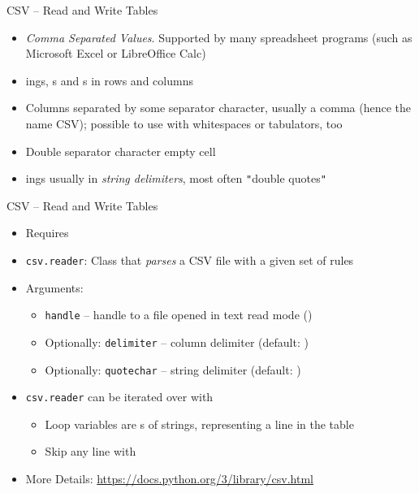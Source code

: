 
\begin{frame}[fragile]{CSV -- Read and Write Tables}
%
\begin{itemize}
\item \emph{Comma Separated Values}. Supported by many spreadsheet programs (such as Microsoft Excel or LibreOffice Calc)
\item {}ings, s and s in rows and columns
\item Columns separated by some separator character, usually a comma (hence the name CSV); possible to use with whitespaces or tabulators, too
\item Double separator character \Thus empty cell
\item {}ings usually in \emph{string delimiters}, most often  \texttt{"}double quotes\texttt{"}
\end{itemize}
%
\end{frame}


\begin{frame}[fragile]{CSV -- Read and Write Tables}
%
\begin{itemize}
\item Requires 
\item \texttt{csv.reader}: Class that \emph{parses} a CSV file with a given set of rules
\item Arguments:
	\begin{itemize}
	\item \texttt{handle} -- handle to a file opened in text read mode ()
	\item Optionally: \texttt{delimiter} -- column delimiter (default: )
	\item Optionally: \texttt{quotechar} -- string delimiter (default: )
	\end{itemize}
\item \texttt{csv.reader} can be iterated over with 
	\begin{itemize}
	\item Loop variables are s of strings, representing a line in the table
	\item Skip any line with 
	\end{itemize}
\item More Details: \url{https://docs.python.org/3/library/csv.html}
\end{itemize}
%
\end{frame}

